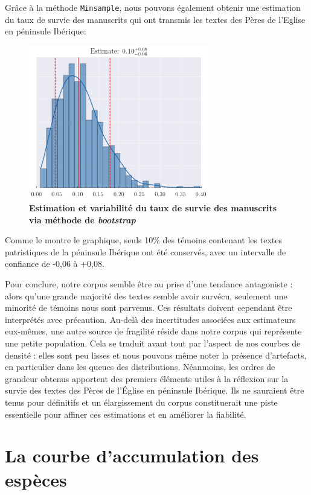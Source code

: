 \documentclass[a4paper,twoside,12pt]{book}
\begin{document}
Grâce à la méthode \texttt{Minsample}, nous pouvons également obtenir une estimation du taux de survie des manuscrits qui ont transmis les textes des Pères de l'Eglise en péninsule Ibérique:

\begin{figure}[H]
	\centering
	\includegraphics[width=0.7\textwidth]{img/minsampleboot.png}
	\caption{\textbf{Estimation et variabilité du taux de survie des manuscrits via méthode de \textit{bootstrap} }}
	\label{fig:ton_label}
\end{figure}
	
Comme le montre le graphique, seuls 10\% des témoins contenant les textes patristiques de la péninsule Ibérique ont été conservés, avec un intervalle de confiance de -0,06 à +0,08.  \newpage


Pour conclure, notre corpus semble être au prise d'une tendance antagoniste : alors qu'une grande majorité des textes semble avoir survécu, seulement une minorité de témoins nous sont parvenus. Ces résultats doivent cependant être interprétés avec précaution. Au-delà des incertitudes associées aux estimateurs eux-mêmes, une autre source de fragilité réside dans notre corpus qui représente une petite population.  Cela se traduit avant tout par l'aspect de nos courbes de densité : elles sont peu lisses et nous pouvons même noter la présence d’artefacts, en particulier dans les queues des distributions. Néanmoins, les ordres de grandeur obtenus apportent des premiers éléments utiles à la réflexion sur la survie des textes des Pères de l’Église en péninsule Ibérique. Ils ne sauraient être tenus pour définitifs et un élargissement du corpus constituerait une piste essentielle pour affiner ces estimations et en améliorer la fiabilité. \newpage

\section {La courbe d'accumulation des espèces}
\end{document}
